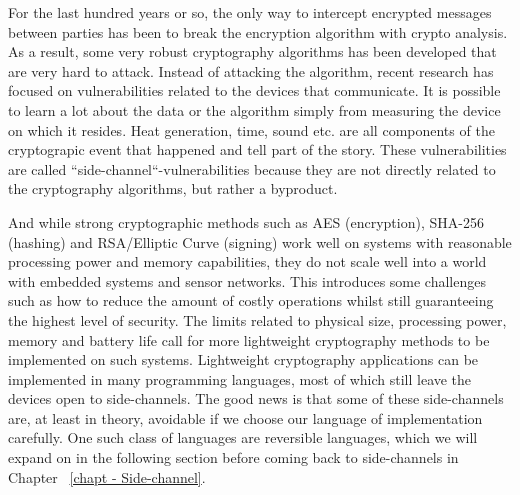 
For the last hundred years or so, the only way to intercept encrypted messages between parties has been to break the encryption algorithm with crypto analysis. As a result, some very robust cryptography algorithms has been developed that are very hard to attack.
Instead of attacking the algorithm, recent research has focused on vulnerabilities related to the devices that communicate.
It is possible to learn a lot about the data or the algorithm simply from measuring the device on which it resides. Heat generation, time, sound etc. are all components of the cryptograpic event that happened and tell part of the story.
These vulnerabilities are called ``side-channel``-vulnerabilities because they are not directly related to the cryptography algorithms, but rather a byproduct.

And while strong cryptographic methods such as AES (encryption), SHA-256 (hashing) and RSA/Elliptic Curve (signing) work well on systems with reasonable processing power and memory capabilities, they do not scale well into a world with embedded systems and sensor networks.
This introduces some challenges such as how to reduce the amount of costly operations whilst still guaranteeing the highest level of security.
The limits related to physical size, processing power, memory and battery life call for more lightweight cryptography methods to be implemented on such systems.
Lightweight cryptography applications can be implemented in many programming languages, most of which still leave the devices open to side-channels.
The good news is that some of these side-channels are, at least in theory, avoidable if we choose our language of implementation carefully.
One such class of languages are reversible languages, which we will expand on in the following section before coming back to side-channels in Chapter ~\ref{chapt - Side-channel}.


